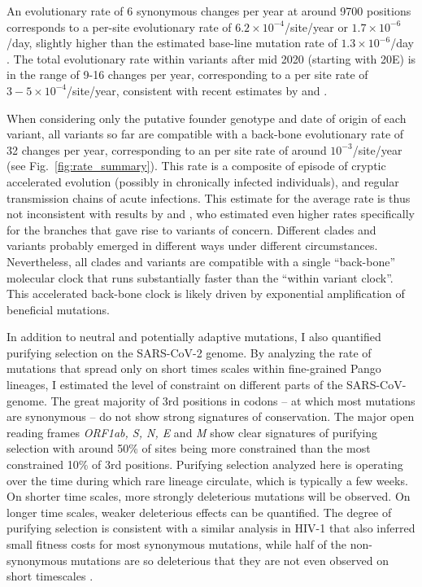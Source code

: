 \documentclass[aps,rmp, twocolumn]{revtex4}
\begin{document}
An evolutionary rate of 6 synonymous changes per year at around 9700 positions corresponds to a per-site evolutionary rate of $6.2\times 10^{-4}$/site/year or $1.7\times 10^{-6}$/day, slightly higher than the estimated base-line mutation rate of $1.3\times 10^{-6}$/day \citep{amicone_mutation_2022}.
The total evolutionary rate within variants after mid 2020 (starting with 20E) is in the range of 9-16 changes per year, corresponding to a per site rate of $3 - 5\times 10^{-4}$/site/year, consistent with recent estimates by \citet{hill_origins_2022} and \citet{tay_emergence_2022}.

When considering only the putative founder genotype and date of origin of each variant, all variants so far are compatible with a back-bone evolutionary rate of 32 changes per year, corresponding to an per site rate of around $10^{-3}$/site/year (see Fig.~\ref{fig:rate_summary}).
This rate is a composite of episode of cryptic accelerated evolution (possibly in chronically infected individuals), and regular transmission chains of acute infections.
This estimate for the average rate is thus not inconsistent with results by \citet{hill_origins_2022} and \citet{tay_emergence_2022}, who estimated even higher rates specifically for the branches that gave rise to variants of concern.
Different clades and variants probably emerged in different ways under different circumstances.
Nevertheless, all clades and variants are compatible with a single ``back-bone'' molecular clock that runs substantially faster than the ``within variant clock''.
This accelerated back-bone clock is likely driven by exponential amplification of beneficial mutations.

In addition to neutral and potentially adaptive mutations, I also quantified purifying selection on the SARS-CoV-2 genome.
By analyzing the rate of mutations that spread only on short times scales within fine-grained Pango lineages, I estimated the level of constraint on different parts of the SARS-CoV-genome.
The great majority of 3rd positions in codons -- at which most mutations are synonymous -- do not show strong signatures of conservation.
The major open reading frames \emph{ORF1ab, S, N, E} and \emph{M} show clear signatures of purifying selection with around 50\% of sites being more constrained than the most constrained 10\% of 3rd positions.
Purifying selection analyzed here is operating over the time during which rare lineage circulate, which is typically a few weeks.
On shorter time scales, more strongly deleterious mutations will be observed.
On longer time scales, weaker deleterious effects can be quantified.
The degree of purifying selection is consistent with a similar analysis in HIV-1 that also inferred small fitness costs for most synonymous mutations, while half of the non-synonymous mutations are so deleterious that they are not even observed on short timescales \citep{zanini_vivo_2017}.
\end{document}
